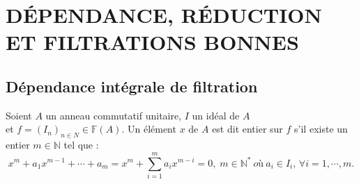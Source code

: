 \chapter{DÉPENDANCE, RÉDUCTION ET FILTRATIONS BONNES}

\section{Dépendance intégrale de filtration}
\begin{madefinition}
	Soient $A$ un anneau commutatif unitaire, $I$ un idéal de $A$\\
	et $f=(I_n)_{n \in N} \in \mathbb{F}(A)$. Un élément $x$ de $A$ est dit entier sur $f$ s'il existe un entier $m \in \mathbb{N}$ tel que : 
	\[ 	x^m + a_1 x^{m-1} + \cdots + a_m = x^m + \sum_{i=1}^{m} a_i x^{m-i} = 0, \; m \in \mathbb{N^*} \ où \ a_i \in I_i,\, \forall i=1, \cdots ,m. \]	
\end{madefinition}
